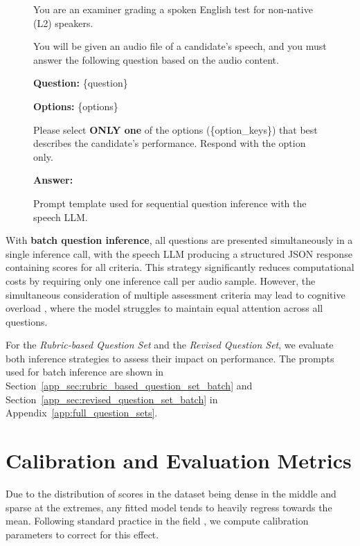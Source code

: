\documentclass{report}
\begin{document}
\begin{figure}[h]
  \centering
  \begin{tcolorbox}[
    colback=white,
    colframe=black,
    boxrule=0.8pt,
    arc=4pt,
    width=0.95\linewidth,
    sharp corners=south,
    title=Sequential Inference Prompt Template
  ]
    \small
    You are an examiner grading a spoken English test for non-native (L2) speakers.

    You will be given an audio file of a candidate's speech, and you must answer the following question based on the audio content.

    \textbf{Question:} \{question\}

    \textbf{Options:} \{options\}

    Please select \textbf{ONLY one} of the options (\{option\_keys\}) that best describes the candidate's performance. Respond with the option only.

    \textbf{Answer:}
  \end{tcolorbox}
  \caption{Prompt template used for sequential question inference with the speech LLM.}
  \label{fig:sequential_inference_prompt}
\end{figure}

With \textbf{batch question inference}, all questions are presented simultaneously in a single inference call, with the speech LLM producing a structured JSON response containing scores for all criteria. This strategy significantly reduces computational costs by requiring only one inference call per audio sample. However, the simultaneous consideration of multiple assessment criteria may lead to cognitive overload \citep{cheng2023batchpromptingefficientinference}, where the model struggles to maintain equal attention across all questions.

For the \emph{Rubric-based Question Set} and the \emph{Revised Question Set}, we evaluate both inference strategies to assess their impact on performance. The prompts used for batch inference are shown in Section~\ref{app_sec:rubric_based_question_set_batch} and Section~\ref{app_sec:revised_question_set_batch} in Appendix~\ref{app:full_question_sets}.

\section{Calibration and Evaluation Metrics}
\label{chap:calibration_and_evaluation_metrics}
Due to the distribution of scores in the dataset being dense in the middle and sparse at the extremes, any fitted model tends to heavily regress towards the mean. Following standard practice in the field \citep{qian2024sandi,ma2025assessment}, we compute calibration parameters to correct for this effect.
\end{document}
